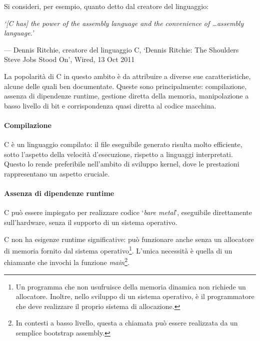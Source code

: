 Si consideri, per esempio, quanto detto dal creatore del linguaggio:
\begin{center}
    \begin{minipage}{0.9\textwidth}
        \vspace{0.5em}
        \itshape `[C has] the power of the assembly language and the convenience of \ldots assembly language.'

        \hfill --- Dennis Ritchie, creatore del linguaggio C, `Dennis Ritchie: The Shoulders Steve Jobs Stood On', Wired, 13 Oct 2011
        \vspace{0.4em}
    \end{minipage}
\end{center}
\noindent La popolarità di C in questo ambito è da attribuire a
diverse sue caratteristiche, alcune delle quali ben documentate\cite{c-system-programming-why}. 
Queste sono principalmente: compilazione, assenza di dipendenze 
runtime, gestione diretta della memoria, manipolazione 
a basso livello di bit e corrispondenza quasi diretta al codice macchina.

\paragraph{Compilazione}
C è un linguaggio compilato: il file eseguibile generato risulta 
molto efficiente, sotto l'aspetto della velocità d'esecuzione, 
rispetto a linguaggi interpretati. Questo lo rende preferibile nell'ambito di sviluppo
kernel, dove le prestazioni rappresentano un aspetto cruciale.

\paragraph{Assenza di dipendenze runtime}
C può essere impiegato per realizzare codice 
`\textit{bare metal}', eseguibile direttamente sull'hardware, 
senza il supporto di un sistema operativo. 

C non ha esigenze runtime significative: può funzionare anche senza un allocatore di memoria fornito dal 
sistema operativo\footnote{Un programma che non usufruisce della memoria 
dinamica non richiede un allocatore. Inoltre, nello sviluppo di un sistema 
operativo, è il programmatore che deve realizzare il proprio sistema di allocazione.}. L'unica 
necessità è quella di un chiamante che invochi la funzione \textit{main}\footnote{In contesti a basso livello, questa a chiamata 
 può essere realizzata da un semplice bootstrap assembly.}.

